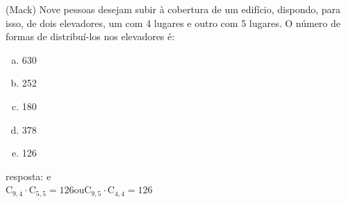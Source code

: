 \begin{ex}
 (Mack) Nove pessoas desejam subir à cobertura de um edifício, dispondo, para isso, de dois elevadores, um com 4 lugares e outro com 5 lugares. O número de formas de distribuí-los nos elevadores é:
    \begin{enumerate}[(a)]
    \item 630
    \item 252
    \item 180
    \item 378
    \item 126
    \end{enumerate}
    \begin{sol}
     resposta: e \\
     $\mathrm{C}_{9,4}\cdot\mathrm{C}_{5,5}=126$\hspace{0.4cm}ou\hspace{0.4 cm}$\mathrm{C}_{9,5}\cdot\mathrm{C}_{4,4}=126$
    \end{sol}
\end{ex}